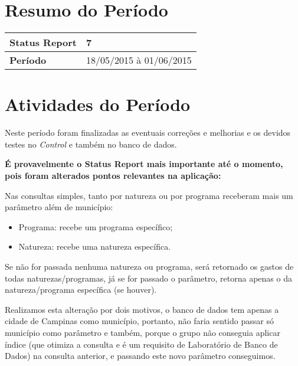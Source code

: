 \documentclass[a4paper,12pt]{article}
\begin{document}

\newpage

\section{Resumo do Período}

\begin{longtable}{|l|l|}
\hline
\textbf{Status Report} & 7\\
\hline
\textbf{Período}	&	18/05/2015 à 01/06/2015 \\
\hline
\end{longtable}


\section{Atividades do Período}

Neste período foram finalizadas as eventuais correções e melhorias e os devidos testes no \textit{Control} e também no banco de dados.


\textbf{É provavelmente o Status Report mais importante até o momento, pois foram alterados pontos relevantes na aplicação:}

Nas consultas simples, tanto por natureza ou por programa receberam mais um parâmetro além de município:

\begin{itemize}
\item Programa: recebe um programa específico;

\item Natureza: recebe uma natureza específica.
\end{itemize}

Se não for passada nenhuma natureza ou programa, será retornado os gastos de todas naturezas/programas, já se for passado o parâmetro, retorna apenas o da natureza/programa específica (se houver).

Realizamos esta alteração por dois motivos, o banco de dados tem apenas a cidade de Campinas como município, portanto, não faria sentido passar só município como parâmetro e também, porque o grupo não conseguia aplicar índice (que otimiza a consulta e é um requisito de Laboratório de Banco de Dados) na consulta anterior, e passando este novo parâmetro conseguimos.
\end{document}
